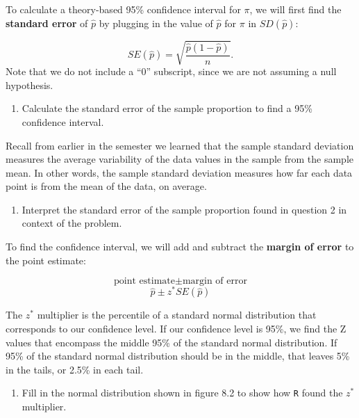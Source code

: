 \documentclass[
]{report}
\providecommand{\tightlist}{%
  \setlength{\itemsep}{0pt}\setlength{\parskip}{0pt}}
\begin{document}
To calculate a theory-based 95\% confidence interval for \(\pi\), we will first find the \textbf{standard error} of \(\hat{p}\) by plugging in the value of \(\hat{p}\) for \(\pi\) in \(SD(\hat{p})\):

\[SE(\hat{p}) = \sqrt{\frac{\hat{p}(1-\hat{p})}{n}}.\]
Note that we do not include a ``0'' subscript, since we are not assuming a null hypothesis.

\begin{enumerate}
\def\labelenumi{\arabic{enumi}.}
\setcounter{enumi}{1}
\tightlist
\item
  Calculate the standard error of the sample proportion to find a 95\% confidence interval.
\end{enumerate}

\vspace{0.5in}

Recall from earlier in the semester we learned that the sample standard deviation measures the average variability of the data values in the sample from the sample mean. In other words, the sample standard deviation measures how far each data point is from the mean of the data, on average.

\begin{enumerate}
\def\labelenumi{\arabic{enumi}.}
\setcounter{enumi}{2}
\tightlist
\item
  Interpret the standard error of the sample proportion found in question 2 in context of the problem.
\end{enumerate}

\vspace{0.8in}

To find the confidence interval, we will add and subtract the \textbf{margin of error} to the point estimate:

\[\text{point estimate}\pm\text{margin of error}\]
\[\hat{p}\pm z^* SE(\hat{p})\]

The \(z^*\) multiplier is the percentile of a standard normal distribution that corresponds to our confidence level. If our confidence level is 95\%, we find the Z values that encompass the middle 95\% of the standard normal distribution. If 95\% of the standard normal distribution should be in the middle, that leaves 5\% in the tails, or 2.5\% in each tail.

\begin{enumerate}
\def\labelenumi{\arabic{enumi}.}
\setcounter{enumi}{3}
\tightlist
\item
  Fill in the normal distribution shown in figure 8.2 to show how \texttt{R} found the \(z^*\) multiplier.
\end{enumerate}
\end{document}
